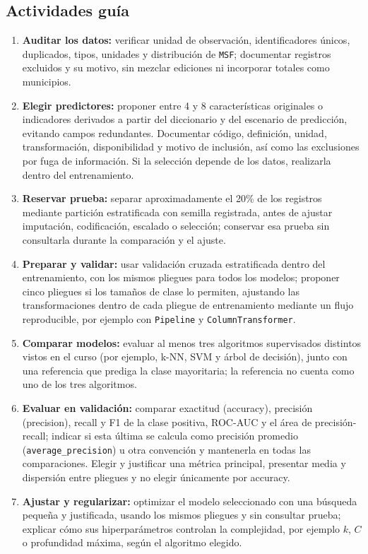 \documentclass[a4,11pt]{aleph-notas}
\begin{document}
\subsection*{Actividades guía}
\begin{enumerate}[leftmargin=*, label={{\arabic*.}}]
    \item \textbf{Auditar los datos:} verificar unidad de observación, identificadores únicos, duplicados, tipos, unidades y distribución de \texttt{MSF}; documentar registros excluidos y su motivo, sin mezclar ediciones ni incorporar totales como municipios.
    \item \textbf{Elegir predictores:} proponer entre 4 y 8 características originales o indicadores derivados a partir del diccionario y del escenario de predicción, evitando campos redundantes. Documentar código, definición, unidad, transformación, disponibilidad y motivo de inclusión, así como las exclusiones por fuga de información. Si la selección depende de los datos, realizarla dentro del entrenamiento.
    \item \textbf{Reservar prueba:} separar aproximadamente el 20\% de los registros mediante partición estratificada con semilla registrada, antes de ajustar imputación, codificación, escalado o selección; conservar esa prueba sin consultarla durante la comparación y el ajuste.
    \item \textbf{Preparar y validar:} usar validación cruzada estratificada dentro del entrenamiento, con los mismos pliegues para todos los modelos; proponer cinco pliegues si los tamaños de clase lo permiten, ajustando las transformaciones dentro de cada pliegue de entrenamiento mediante un flujo reproducible, por ejemplo con \texttt{Pipeline} y \texttt{ColumnTransformer}.
    \item \textbf{Comparar modelos:} evaluar al menos tres algoritmos supervisados distintos vistos en el curso (por ejemplo, k-NN, SVM y árbol de decisión), junto con una referencia que prediga la clase mayoritaria; la referencia no cuenta como uno de los tres algoritmos.
    \item \textbf{Evaluar en validación:} comparar exactitud (accuracy), precisión (precision), recall y F1 de la clase positiva, ROC-AUC y el área de precisión-recall; indicar si esta última se calcula como precisión promedio (\texttt{average\_precision}) u otra convención y mantenerla en todas las comparaciones. Elegir y justificar una métrica principal, presentar media y dispersión entre pliegues y no elegir únicamente por accuracy.
    \item \textbf{Ajustar y regularizar:} optimizar el modelo seleccionado con una búsqueda pequeña y justificada, usando los mismos pliegues y sin consultar prueba; explicar cómo sus hiperparámetros controlan la complejidad, por ejemplo $k$, $C$ o profundidad máxima, según el algoritmo elegido.

\end{enumerate}
\end{document}
